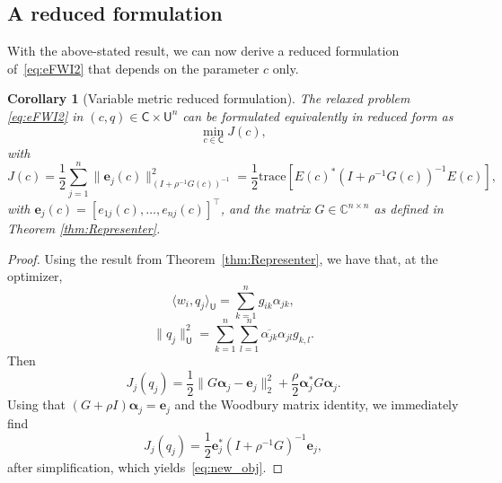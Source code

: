 \documentclass[12pt]{amsart}
\newtheorem{cor}{Corollary}
\begin{document}
\subsection{A reduced formulation}
With the above-stated result, we can now derive a reduced formulation of~\eqref{eq:eFWI2} that depends on the parameter $c$ only.
\begin{cor}
[Variable metric reduced formulation]
\label{thm2}
The relaxed problem \eqref{eq:eFWI2} in $(c, q) \in \mathsf{C}\times \mathsf{U}^n$ can be formulated equivalently in reduced form as
\[
\min_{c\in\mathsf{C}} J(c),
\]
with
\begin{equation}\label{eq:new_obj}
J(c) =  {\textstyle\frac{1}{2}}\sum_{j=1}^n\|\mathbf{e}_j(c)\|_{(I+\rho^{-1}G(c))^{-1}}^2 =   {\textstyle\frac{1}{2}}\text{trace}\left[E(c)^*(I+\rho^{-1}G(c))^{-1}E(c)\right],
\end{equation}
with
${\mathbf{e}}_j(c) = [e_{1j}(c),\ldots,e_{nj}(c)]^\top$, and the matrix $G \in \mathbb{C}^{n\times n}$ as defined in Theorem \ref{thm:Representer}.
\end{cor}
\begin{proof}
Using the result from Theorem~\ref{thm:Representer}, we have that, at the optimizer,
$$\langle w_i, q_j\rangle_\mathsf{U} = \sum_{k=1}
^n g_{ik}\alpha_{jk},$$
$$\|q_j\|_{\mathsf{U}}^2 = \sum_{k=1}^n \sum_{l=1}^n\overline{\alpha_{jk}}\alpha_{jl}g_{k,l}.$$
Then
$$J_j(q_j)=  {\textstyle\frac{1}{2}}\|G\boldsymbol{\alpha}_j - \mathbf{e}_j\|_2^2 +  {\textstyle\frac{\rho}{2}}\boldsymbol{\alpha}_j^* G\boldsymbol{\alpha}_j.$$
Using that $(G + \rho I)\boldsymbol{\alpha}_j = \mathbf{e}_j$ and the Woodbury matrix identity, we immediately find
$$J_j(q_j) =  {\textstyle\frac{1}{2}}\mathbf{e}_j^*(I + \rho^{-1}G)^{-1}\mathbf{e}_j,$$
after simplification, which yields~\eqref{eq:new_obj}.
\end{proof}
\end{document}
